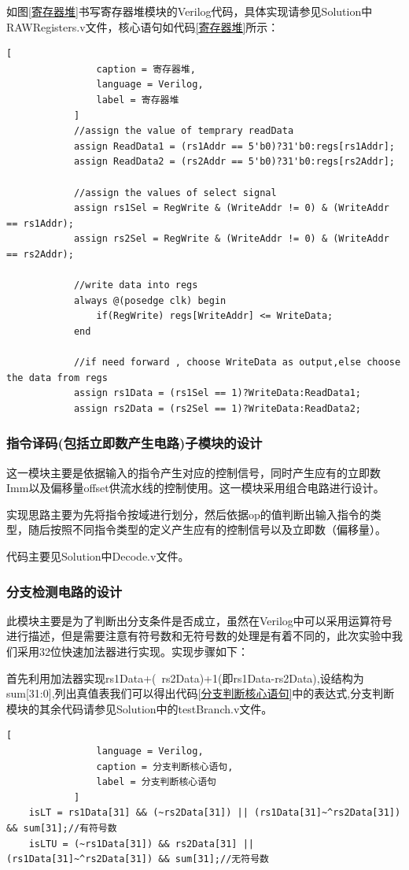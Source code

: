 \documentclass{../source/zjureport}
\begin{document}
            如图\ref{寄存器堆}书写寄存器堆模块的Verilog代码，具体实现请参见Solution中RAWRegisters.v文件，核心语句如代码\ref{寄存器堆}所示：
            \begin{lstlisting}[
                caption = 寄存器堆,
                language = Verilog,
                label = 寄存器堆
            ]
            //assign the value of temprary readData
            assign ReadData1 = (rs1Addr == 5'b0)?31'b0:regs[rs1Addr];
            assign ReadData2 = (rs2Addr == 5'b0)?31'b0:regs[rs2Addr];
        
            //assign the values of select signal
            assign rs1Sel = RegWrite & (WriteAddr != 0) & (WriteAddr == rs1Addr);
            assign rs2Sel = RegWrite & (WriteAddr != 0) & (WriteAddr == rs2Addr);
        
            //write data into regs
            always @(posedge clk) begin
                if(RegWrite) regs[WriteAddr] <= WriteData;
            end
        
            //if need forward , choose WriteData as output,else choose the data from regs
            assign rs1Data = (rs1Sel == 1)?WriteData:ReadData1;
            assign rs2Data = (rs2Sel == 1)?WriteData:ReadData2;
            \end{lstlisting} 
            
            \subsubsection{指令译码(包括立即数产生电路)子模块的设计}
            这一模块主要是依据输入的指令产生对应的控制信号，同时产生应有的立即数Imm以及偏移量offset供流水线的控制使用。这一模块采用组合电路进行设计。

            实现思路主要为先将指令按域进行划分，然后依据op的值判断出输入指令的类型，随后按照不同指令类型的定义产生应有的控制信号以及立即数（偏移量）。

            代码主要见Solution中Decode.v文件。

            \subsubsection{分支检测电路的设计}
            此模块主要是为了判断出分支条件是否成立，虽然在Verilog中可以采用运算符号进行描述，但是需要注意有符号数和无符号数的处理是有着不同的，此次实验中我们采用32位快速加法器进行实现。实现步骤如下：

            首先利用加法器实现rs1Data+(~rs2Data)+1(即rs1Data-rs2Data),设结构为sum[31:0],列出真值表我们可以得出代码\ref{分支判断核心语句}中的表达式,分支判断模块的其余代码请参见Solution中的testBranch.v文件。
            \begin{lstlisting}[
                language = Verilog,
                caption = 分支判断核心语句,
                label = 分支判断核心语句
            ]
    isLT = rs1Data[31] && (~rs2Data[31]) || (rs1Data[31]~^rs2Data[31]) && sum[31];//有符号数
    isLTU = (~rs1Data[31]) && rs2Data[31] || (rs1Data[31]~^rs2Data[31]) && sum[31];//无符号数
            \end{lstlisting}
\end{document}
